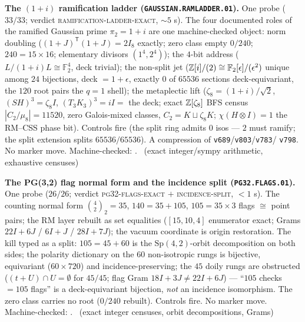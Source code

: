 \par\smallskip\noindent\textbf{The $(1{+}i)$ ramification ladder
(\texttt{GAUSSIAN.RAMLADDER.01}).}
One probe ($33/33$; verdict \textsc{ramification-ladder-exact},
$\sim5$ s).  The four documented roles of the ramified Gaussian
prime $\pi_2 = 1{+}i$ are one machine-checked object: norm
doubling ($(1{+}J)^{\mathsf T}(1{+}J) = 2I_8$ exactly; zero class
empty $0/240$; $240 = 15\times16$; elementary divisors
$(1^4,2^4)$); the $4$-bit address ($L/(1{+}i)L \cong \mathbb
F_2^4$, deck trivial); the non-split jet ($\mathbb{Z}[i]/(2) \cong
\mathbb F_2[\epsilon]/(\epsilon^2)$ unique among $24$ bijections,
deck $= 1{+}\epsilon$, exactly $0$ of $65536$ sections
deck-equivariant, the $120$ root pairs the $q{=}1$ shell); the
metaplectic lift ($\zeta_8 = (1{+}i)/\sqrt2$, $(SH)^3 = \zeta_8I$,
$(T_3K_3)^3 = iI =$ the deck; exact $\mathbb{Z}[\zeta_8]$ BFS census
$|C_2/\mu_8| = 11520$, zero Galois-mixed classes,
$C_2 = K \sqcup \zeta_8K$; $\chi(H{\otimes}I) = 1$ the RM--CSS
phase bit).  Controls fire (the split ring admits $0$ isos ---
$2$ must ramify; the split extension splits $65536/65536$).  A
compression of \texttt{v689}/\texttt{v803}/\texttt{v783}/%
\texttt{v798}.  No marker move.
Machine-checked: .
\mE\ (exact integer/sympy arithmetic, exhaustive censuses)
\par\smallskip

\par\smallskip\noindent\textbf{The PG(3,2) flag normal form and
the incidence split (\texttt{PG32.FLAGS.01}).}
One probe ($26/26$; verdict \textsc{pg32-flags-exact} $+$
\textsc{incidence-split}, $<1$ s).  The counting normal form
$\binom{4}{2}_2 = 35$, $140 = 35 + 105$, $105 = 35\times3$ flags
$\cong$ point pairs; the RM layer rebuilt as set equalities
($[15,10,4]$ enumerator exact; Grams $22I{+}6J$ / $6I{+}J$ /
$28I{+}7J$); the vacuum coordinate is origin restoration.  The
kill typed as a split: $105 = 45 + 60$ is the
$\mathrm{Sp}(4,2)$-orbit decomposition on both sides; the
polarity dictionary on the $60$ non-isotropic rungs is bijective,
equivariant ($60\times720$) and incidence-preserving; the $45$
doily rungs are obstructed ($(t{+}U)\cap U = \emptyset$ for
$45/45$; flag Gram $18I{+}3J \ne 22I{+}6J$) --- ``$105$ checks
$= 105$ flags'' is a deck-equivariant bijection, \emph{not} an
incidence isomorphism.  The zero class carries no root ($0/240$
rebuilt).  Controls fire.  No marker move.
Machine-checked: .
\mE\ (exact integer censuses, orbit decompositions, Grams)
\par\smallskip

